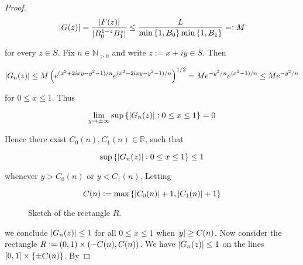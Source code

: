 \begin{proof}
\begin{equation*}
	\abs[0]{G(z)} = \frac{\abs[0]{F(z)}}{\abs[0]{B_0^{1 - z}B_1^z}} \leq \frac{L}{\min\cbr[0]{1,B_0}\min\cbr[0]{1,B_1}} =: M
\end{equation*}

\noindent for every $z \in \overline{S}$. Fix $n \in \mathbb{N}_{>0}$ and write $z := x + iy \in \overline{S}$. Then

\begin{gather*}
	\abs[0]{G_n(z)} \leq M \del{e^{\del[0]{x^2 + 2ixy -y^2 - 1}/n} e^{\del[0]{x^2 - 2ixy -y^2 - 1}/n}}^{1/2}= M e^{-y^2/n}e^{\del[0]{x^2 - 1}/n} \leq Me^{-y^2/n}
\end{gather*}

\noindent for $0 \leq x \leq 1$. Thus
	
\begin{equation*}
	\lim_{y \to \pm \infty}\sup\cbr[0]{\abs[0]{G_n(z)} : 0 \leq x \leq 1} = 0
\end{equation*}

\noindent Hence there exist $C_0(n),C_1(n) \in \mathbb{R}$, such that 

\begin{equation*}
	\sup\cbr[0]{\abs[0]{G_n(z)} : 0 \leq x \leq 1} \leq 1
\end{equation*}

\noindent whenever $y > C_0(n)$ or $y < C_1(n)$. Letting

\begin{equation*}
	C(n) := \max\cbr[0]{\abs[0]{ C_0(n)} + 1, \abs[0]{ C_1(n) } + 1}
\end{equation*}

\begin{figure}[h!tb]
	\centering
	\caption{Sketch of the rectangle $\overline{R}$.}
	\label{fig:Hadamards_three_lines_lemma_proof}
\end{figure}

\noindent we conclude $\abs[0]{ G_n(z)} \leq 1$ for all $0 \leq x \leq 1$ when $\abs{ y } \geq C(n)$. Now consider the rectangle $R := \intoo{0,1} \times \intoo[0]{-C(n),C(n)}$. We have $\abs[0]{G_n(z)} \leq 1$ on the lines $\intcc{0,1} \times \cbr[0]{\pm C(n)}$. By


\end{proof}
